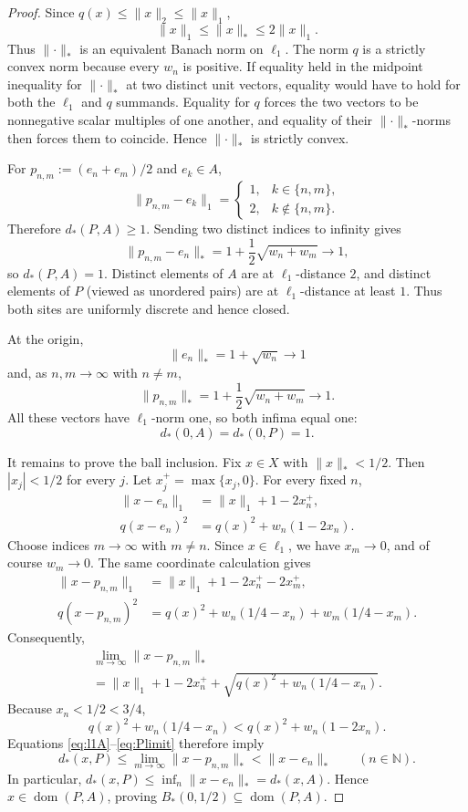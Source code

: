 \documentclass[11pt]{article}
\newcommand{\Nstar}{\lVert\cdot\rVert_*}
\DeclareMathOperator{\domreg}{dom}
\begin{document}
\begin{proof}
Since $q(x)\le \lVert x\rVert_2\le \lVert x\rVert_1$,
\[
 \lVert x\rVert_1\le \lVert x\rVert_*\le 2\lVert x\rVert_1.
\]
Thus $\Nstar$ is an equivalent Banach norm on $\ell_1$. The norm $q$ is a strictly convex norm because every $w_n$ is positive. If equality held in the midpoint inequality for $\Nstar$ at two distinct unit vectors, equality would have to hold for both the $\ell_1$ and $q$ summands. Equality for $q$ forces the two vectors to be nonnegative scalar multiples of one another, and equality of their $\Nstar$-norms then forces them to coincide. Hence $\Nstar$ is strictly convex.

For $p_{n,m}:=(e_n+e_m)/2$ and $e_k\in A$,
\[
 \lVert p_{n,m}-e_k\rVert_1=
 \begin{cases}
 1,&k\in\{n,m\},\\
 2,&k\notin\{n,m\}.
 \end{cases}
\]
Therefore $d_*(P,A)\ge1$. Sending two distinct indices to infinity gives
\[
 \lVert p_{n,m}-e_n\rVert_*
 =1+\frac12\sqrt{w_n+w_m}\longrightarrow1,
\]
so $d_*(P,A)=1$. Distinct elements of $A$ are at $\ell_1$-distance $2$, and distinct elements of $P$ (viewed as unordered pairs) are at $\ell_1$-distance at least $1$. Thus both sites are uniformly discrete and hence closed.

At the origin,
\[
 \lVert e_n\rVert_*=1+\sqrt{w_n}\longrightarrow1
\]
and, as $n,m\to\infty$ with $n\ne m$,
\[
 \lVert p_{n,m}\rVert_*=1+\frac12\sqrt{w_n+w_m}\longrightarrow1.
\]
All these vectors have $\ell_1$-norm one, so both infima equal one:
\[
 d_*(0,A)=d_*(0,P)=1.
\]

It remains to prove the ball inclusion. Fix $x\in X$ with $\lVert x\rVert_*<1/2$. Then $|x_j|<1/2$ for every $j$. Let $x_j^+=\max\{x_j,0\}$. For every fixed $n$,
\begin{align}
 \lVert x-e_n\rVert_1
 &=\lVert x\rVert_1+1-2x_n^+,
 \label{eq:l1A}\\
 q(x-e_n)^2
 &=q(x)^2+w_n(1-2x_n).
 \label{eq:qA}
\end{align}
Choose indices $m\to\infty$ with $m\ne n$. Since $x\in\ell_1$, we have $x_m\to0$, and of course $w_m\to0$. The same coordinate calculation gives
\begin{align*}
 \lVert x-p_{n,m}\rVert_1
 &=\lVert x\rVert_1+1-2x_n^+-2x_m^+,\\
 q(x-p_{n,m})^2
 &=q(x)^2+w_n(1/4-x_n)+w_m(1/4-x_m).
\end{align*}
Consequently,
\begin{multline}
 \lim_{m\to\infty}\lVert x-p_{n,m}\rVert_*\\
 =\lVert x\rVert_1+1-2x_n^+
 +\sqrt{q(x)^2+w_n(1/4-x_n)}.
 \label{eq:Plimit}
\end{multline}
Because $x_n<1/2<3/4$,
\[
 q(x)^2+w_n(1/4-x_n)
 <q(x)^2+w_n(1-2x_n).
\]
Equations \eqref{eq:l1A}--\eqref{eq:Plimit} therefore imply
\[
 d_*(x,P)
 \le \lim_{m\to\infty}\lVert x-p_{n,m}\rVert_*
 <\lVert x-e_n\rVert_*
 \qquad(n\in\mathbb N).
\]
In particular, $d_*(x,P)\le\inf_n\lVert x-e_n\rVert_*=d_*(x,A)$. Hence $x\in\domreg(P,A)$, proving
$B_*(0,1/2)\subseteq\domreg(P,A)$.


\end{proof}
\end{document}
